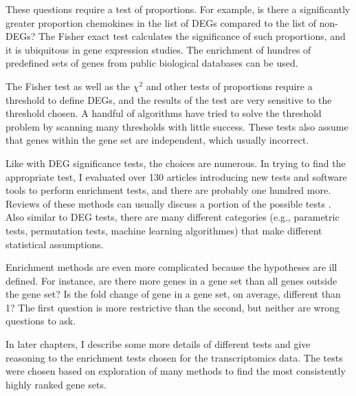 These questions require a test of proportions. For example,
is there a significantly greater proportion chemokines in the list
of DEGs compared to the list of non-DEGs?
The Fisher exact test calculates the significance of such proportions, and it
is ubiquitous in gene expression studies. The enrichment of hundres
of predefined sets of genes from public biological databases can be used.

The Fisher test as well as the $\chi^2$ and other tests of proportions
require a threshold to define DEGs, and the results of the test are
very sensitive to the threshold chosen. A handful of algorithms have
tried to solve the threshold problem by scanning many thresholds
with little success. These tests also assume that genes within the
gene set are independent, which usually incorrect.

Like with DEG significance tests, the choices are numerous.
In trying to find the appropriate test, I evaluated over 130 articles
introducing new tests and software tools to perform enrichment tests, and there
are probably one hundred more.
Reviews of these methods can usually discuss a portion of 
the possible tests \cite{Ackermann:2009bw,Huang:2009bea,Abatangelo:2009cc,
Berg:2009tu,Dinu:2008tv}.
Also similar to DEG tests, there are many different categories (e.g., 
parametric tests, permutation tests, machine learning algorithmes)
that make different statistical assumptions.

Enrichment methods are even more complicated because the hypotheses
are ill defined. For instance, are there more genes in a gene set
than all genes outside the gene set? Is the fold change of gene
in a gene set, on average, different than 1? The first question
is more restrictive than the second, but neither are wrong questions
to ask.

In later chapters, I describe some more details of different tests
and give reasoning to the enrichment tests chosen for
the transcriptomics data. The tests were chosen based on exploration
of many methods to find the most consistently highly ranked
gene sets. 












